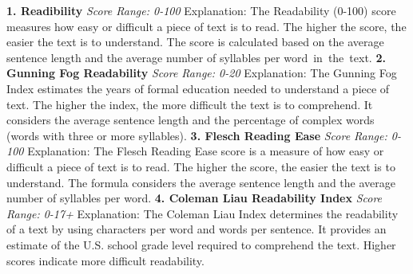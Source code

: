 \documentclass[table,french,english]{rapportCS}
\begin{document}
{\small 
\textbf{1. Readibility}\newline
\textit{Score Range: 0-100}\newline
Explanation: The Readability (0-100) score measures how easy or difficult a piece of text is to read. The higher the score, the easier the text is to understand. The score is calculated based on the average sentence length and the average number of syllables per word in the text.
\textbf{}\newline
\textbf{2. Gunning Fog Readability}\newline
\textit{Score Range: 0-20}\newline
Explanation: The Gunning Fog Index estimates the years of formal education needed to understand a piece of text. The higher the index, the more difficult the text is to comprehend. It considers the average sentence length and the percentage of complex words (words with three or more syllables).
\textbf{}\newline
\textbf{3. Flesch Reading Ease}\newline
\textit{Score Range: 0-100}\newline
Explanation: The Flesch Reading Ease score is a measure of how easy or difficult a piece of text is to read. The higher the score, the easier the text is to understand. The formula considers the average sentence length and the average number of syllables per word.
\textbf{}\newline
\textbf{4. Coleman Liau Readability Index}\newline
\textit{Score Range: 0-17+}\newline
Explanation: The Coleman Liau Index determines the readability of a text by using characters per word and words per sentence. It provides an estimate of the U.S. school grade level required to comprehend the text. Higher scores indicate more difficult readability.

}
\end{document}
